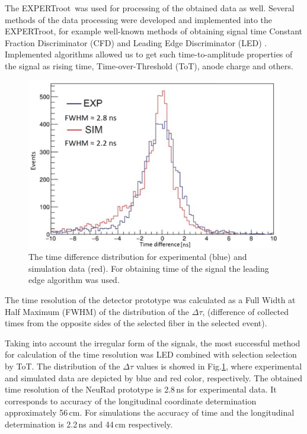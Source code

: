 \documentclass{webofc}
\newcommand{\er}{\textmd{EXPERTroot}}
\begin{document}
	The \er\, was used for processing of the obtained data as well.
	Several methods of the data processing were developed and implemented into the \er, for example well-known methods of obtaining signal time Constant Fraction Discriminator (CFD) and Leading Edge Discriminator (LED) \cite{diplom}.
	Implemented algorithms allowed us to get such time-to-amplitude properties of the signal as rising time, Time-over-Threshold (ToT), anode charge and others. 
\begin{figure}
	\includegraphics[width=\linewidth]{tausim.png}
	\caption{The time difference distribution for experimental (blue) and simulation data (red). For obtaining time of the signal the leading edge algorithm was used.}\label{ris:tausim}
\end{figure}
	
	The time resolution of the detector prototype was calculated as a Full Width at Half Maximum (FWHM) of the distribution of the $\Delta \tau$, (difference of collected times from the opposite sides of the selected fiber in the selected event).
%
%

	Taking into account the irregular form of the signals, the most successful method for calculation of the time resolution was LED combined with selection selection  by ToT.
	The distribution of the $\Delta \tau$ values is showed in Fig.\ref{ris:tausim}, where experimental and simulated data are depicted by blue and red color, respectively.
	The obtained time resolution of the NeuRad prototype is 2.8\,ns for experimental data. It corresponds to accuracy of the longitudinal coordinate determination approximately 56\,cm. For simulations the accuracy of time and the longitudinal determination is 2.2\,ns and 44\,cm respectively.
\end{document}
